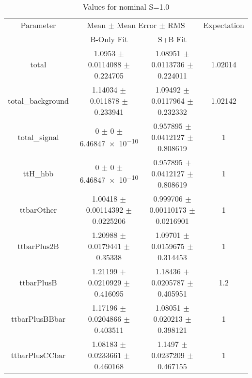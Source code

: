 \begin{table}
\centering
\caption{Values for nominal S=1.0}
\begin{tabular}{cccc}
\toprule
Parameter & \multicolumn{2}{c}{Mean $\pm$ Mean Error $\pm$ RMS} & Expectation\\
 & B-Only Fit & S+B Fit & \\
\midrule
total & \num{1.0953} $\pm$ \num{0.0114088} $\pm$ \num{0.224705} & \num{1.08951} $\pm$ \num{0.0113736} $\pm$ \num{0.224011} & \num{1.02014}\\
total\_background & \num{1.14034} $\pm$ \num{0.011878} $\pm$ \num{0.233941} & \num{1.09492} $\pm$ \num{0.0117964} $\pm$ \num{0.232332} & \num{1.02142}\\
total\_signal & \num{0} $\pm$ \num{0} $\pm$ \num{6.46847e-10} & \num{0.957895} $\pm$ \num{0.0412127} $\pm$ \num{0.808619} & \num{1}\\
ttH\_hbb & \num{0} $\pm$ \num{0} $\pm$ \num{6.46847e-10} & \num{0.957895} $\pm$ \num{0.0412127} $\pm$ \num{0.808619} & \num{1}\\
ttbarOther & \num{1.00418} $\pm$ \num{0.00114392} $\pm$ \num{0.0225206} & \num{0.999706} $\pm$ \num{0.00110173} $\pm$ \num{0.0216901} & \num{1}\\
ttbarPlus2B & \num{1.20988} $\pm$ \num{0.0179441} $\pm$ \num{0.35338} & \num{1.09701} $\pm$ \num{0.0159675} $\pm$ \num{0.314453} & \num{1}\\
ttbarPlusB & \num{1.21199} $\pm$ \num{0.0210929} $\pm$ \num{0.416095} & \num{1.18436} $\pm$ \num{0.0205787} $\pm$ \num{0.405951} & \num{1.2}\\
ttbarPlusBBbar & \num{1.17196} $\pm$ \num{0.0204866} $\pm$ \num{0.403511} & \num{1.08051} $\pm$ \num{0.020213} $\pm$ \num{0.398121} & \num{1}\\
ttbarPlusCCbar & \num{1.08183} $\pm$ \num{0.0233661} $\pm$ \num{0.460168} & \num{1.1497} $\pm$ \num{0.0237209} $\pm$ \num{0.467155} & \num{1}\\
\bottomrule
\end{tabular}
\end{table}